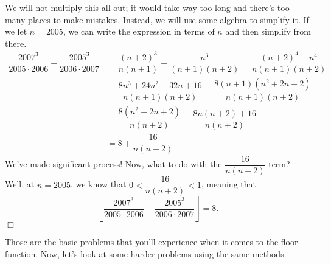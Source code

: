 \documentclass[lang=en,11pt]{elegantbook}
\begin{document}
\begin{solution}
We will not multiply this all out; it would take way too long and there's too many places to make mistakes.  Instead, we will use some algebra to simplify it.  If we let $n=2005$, we can write the expression in terms of $n$ and then simplify from there.  \begin{align*}
    \dfrac{2007^3}{2005 \cdot 2006}-\dfrac{2005^3}{2006\cdot 2007}&=\dfrac{(n+2)^3}{n(n+1)}-\dfrac{n^3}{(n+1)(n+2)}=\dfrac{(n+2)^4-n^4}{n(n+1)(n+2)} \\
    &=\dfrac{8n^3+24n^2+32n+16}{n(n+1)(n+2)}=\dfrac{8(n+1)(n^2+2n+2)}{n(n+1)(n+2)} \\
    &=\dfrac{8(n^2+2n+2)}{n(n+2)}=\dfrac{8n(n+2)+16}{n(n+2)} \\
    &=8+\dfrac{16}{n(n+2)} 
\end{align*}
We've made significant process!  Now, what to do with the $\dfrac{16}{n(n+2)}$ term? Well, at $n=2005$, we know that $0<\dfrac{16}{n(n+2)}<1$, meaning that $$\left\lfloor{\dfrac{2007^3}{2005 \cdot 2006}-\dfrac{2005^3}{2006\cdot 2007}}\right\rfloor=8.$$ $\Box$
\end{solution}
Those are the basic problems that you'll experience when it comes to the floor function.  Now, let's look at some harder problems using the same methods.
\end{document}
